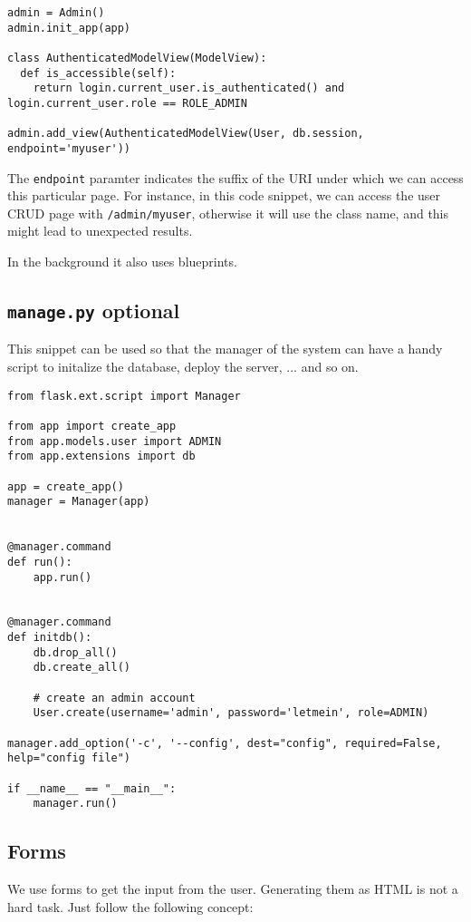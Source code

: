 \documentclass[../main/main.tex]{subfiles}
\begin{document}
\begin{lstlisting}
admin = Admin()
admin.init_app(app)

class AuthenticatedModelView(ModelView):
  def is_accessible(self):
    return login.current_user.is_authenticated() and login.current_user.role == ROLE_ADMIN

admin.add_view(AuthenticatedModelView(User, db.session, endpoint='myuser'))

\end{lstlisting}

The \lstinline|endpoint| paramter indicates the suffix of the URI under which we
can access this particular page. For instance, in this code snippet, we can
access the user CRUD page with \lstinline|/admin/myuser|, otherwise it will use
the class name, and this might lead to unexpected results. 

In the background it also uses blueprints. 


\subsection{\lstinline|manage.py| optional}

This snippet can be used so that the manager of the system can have a handy
script to initalize the database, deploy the server, ... and so on.

\begin{lstlisting}
from flask.ext.script import Manager

from app import create_app
from app.models.user import ADMIN
from app.extensions import db

app = create_app()
manager = Manager(app)


@manager.command
def run():
    app.run()


@manager.command
def initdb():
    db.drop_all()
    db.create_all()

    # create an admin account 
    User.create(username='admin', password='letmein', role=ADMIN)

manager.add_option('-c', '--config', dest="config", required=False, help="config file")

if __name__ == "__main__":
    manager.run()
\end{lstlisting}

\subsection{Forms}

We use forms to get the input from the user. Generating them as HTML is
not a hard task. Just follow the following concept: 
\end{document}

